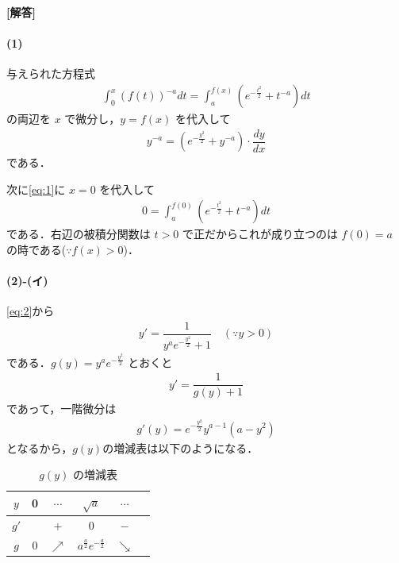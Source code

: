 \documentclass[../../main.tex]{subfiles}
\begin{document}
\begin{oframed}
  
\end{oframed}

{\bf [解答]}

\paragraph{(1)}

与えられた方程式
\begin{align}
  \int_0^x{(f(t))}^{-a}dt=\int_a^{f(x)}(e^{\displaystyle-\frac{t^2}{2}}+t^{-a})dt \label{eq:1}
\end{align}
の両辺を $x$ で微分し，$y=f(x)$ を代入して
\begin{align}
  y^{-a} = \left( e^{-\frac{y^2}{2}} + y^{-a} \right) \cdot \dfrac{dy}{dx} \label{eq:2}
\end{align}
である．

次に\cref{eq:1}に $x=0$ を代入して
\begin{align}
  0 = \int_a^{f(0)} \left( e^{-\frac{t^2}{2}} + t^{-a} \right) dt \label{eq:3}
\end{align}
である．右辺の被積分関数は $t>0$ で正だからこれが成り立つのは $f(0) = a$ の時である($\because f(x)>0$)．

\paragraph{(2)-(イ)}

\cref{eq:2}から
\begin{align}
  y' = \dfrac{1}{y^a e^{-\frac{y^2}{2}} + 1} \quad (\because y>0) \label{eq:4}
\end{align}
である．$g(y) = y^a e^{-\frac{y^2}{2}}$ とおくと
\begin{align}
  y' = \dfrac{1}{g(y)+1}
\end{align}
であって，一階微分は
\begin{align}
  g'(y) = e^{-\frac{y^2}{2}} y^{a-1} (a - y^2)
\end{align}
となるから，$g(y)$の増減表は以下のようになる．

\begin{table}[htb]
  \centering
  \caption{$g(y)$ の増減表}
  \begin{tabular}{c|c|c|c|c|c}
    $y$ & 0 & $\cdots$ & $\sqrt{a}$ & $\cdots$ & \\
    \hline
    $g'$ & & $+$ & $0$ & $-$ & \\
    \hline
    $g$ & 0 & $\nearrow$ & $a^{\frac{a}{2}} e^{-\frac{a}{2}}$ & $\searrow$ &
  \end{tabular}
\end{table}
\end{document}
